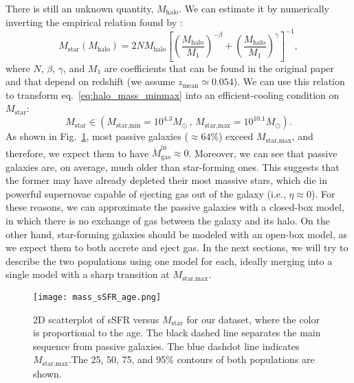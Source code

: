 \documentclass[fleqn,usenatbib]{mnras}
\begin{document}
\smallskip
There is still an unknown quantity, $M_\text{halo}$. We can estimate it by numerically inverting the empirical relation found by \citet{Moster_2012}:
\begin{equation}
    M_\text{star} \left(M_\text{halo}\right) = 2N M_\text{halo} \left[\left(\dfrac{M_\text{halo}}{M_1}\right)^{-\beta} + \left(\dfrac{M_\text{halo}}{M_1}\right)^\gamma\right]^{-1},
	\label{eq:moster}
\end{equation}
where $N$, $\beta$, $\gamma$, and $M_1$ are coefficients that can be found in the original paper and that depend on redshift (we assume $z_{\text{mean}} \simeq 0.054$). We can use this relation to transform eq.~\ref{eq:halo_mass_minmax} into an efficient-cooling condition on $M_\text{star}$:
\begin{equation}
    M_\text{star} \in \left( M_\text{star,min}=10^{4.3} M_\odot \, , \, M_\text{star,max}=10^{10.1} M_\odot \right).
	\label{eq:star_mass_minmax}
\end{equation}
As shown in Fig.~\ref{fig:mass_sSFR_age}, most passive galaxies ($\approx 64\%$) exceed $M_\text{star,max}$, and therefore, we expect them to have $\dot{M}_\text{gas}^\text{in} \approx 0$.
Moreover, we can see that passive galaxies are, on average, much older than star-forming ones. This suggests that the former may have already depleted their most massive stars, which die in powerful supernovae capable of ejecting gas out of the galaxy (i.e., $\eta \approx 0$). For these reasons, we can approximate the passive galaxies with a closed-box model, in which there is no exchange of gas between the galaxy and its halo. On the other hand, star-forming galaxies should be modeled with an open-box model, as we expect them to both accrete and eject gas. In the next sections, we will try to describe the two populations using one model for each, ideally merging into a single model with a sharp transition at $M_\text{star,max}$.
\begin{figure}\centering
	\texttt{[image: mass\_sSFR\_age.png]}
    \caption{2D scatterplot of sSFR versus $M_{\text{star}}$ for our dataset, where the color is proportional to the age. The black dashed line separates the main sequence from passive galaxies. The blue dashdot line indicates $M_{\text{star,max}}$.The 25, 50, 75, and 95\% contours of both populations are shown.}
    \label{fig:mass_sSFR_age}
\end{figure}
\end{document}
